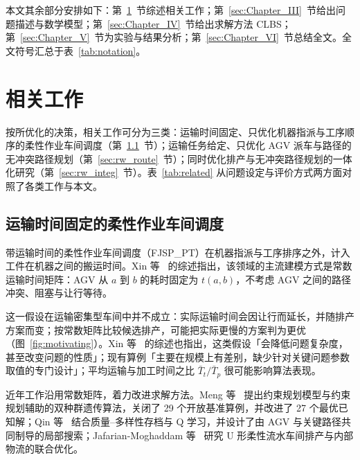 \documentclass[manuscript,screen,review]{acmart}
\begin{document}
本文其余部分安排如下：第~\ref{sec:Chapter_II}~节综述相关工作；第~\ref{sec:Chapter_III}~节给出问题描述与数学模型；第~\ref{sec:Chapter_IV}~节给出求解方法 CLBS；第~\ref{sec:Chapter_V}~节为实验与结果分析；第~\ref{sec:Chapter_VI}~节总结全文。全文符号汇总于表~\ref{tab:notation}。

\section{相关工作}
\label{sec:Chapter_II}

按所优化的决策，相关工作可分为三类：运输时间固定、只优化机器指派与工序顺序的柔性作业车间调度（第~\ref{sec:rw_fjsp}~节）；运输任务给定、只优化 AGV 派车与路径的无冲突路径规划（第~\ref{sec:rw_route}~节）；同时优化排产与无冲突路径规划的一体化研究（第~\ref{sec:rw_integ}~节）。表~\ref{tab:related} 从问题设定与评价方式两方面对照了各类工作与本文。

\subsection{运输时间固定的柔性作业车间调度}
\label{sec:rw_fjsp}

带运输时间的柔性作业车间调度（FJSP\_PT）在机器指派与工序排序之外，计入工件在机器之间的搬运时间。Xin 等~\cite{xin2025review} 的综述指出，该领域的主流建模方式是常数运输时间矩阵：AGV 从 $a$ 到 $b$ 的耗时固定为 $t(a,b)$，不考虑 AGV 之间的路径冲突、阻塞与让行等待。

这一假设在运输密集型车间中并不成立：实际运输时间会因让行而延长，并随排产方案而变；按常数矩阵比较候选排产，可能把实际更慢的方案判为更优（图~\ref{fig:motivating}）。Xin 等~\cite{xin2025review} 的综述也指出，这类假设「会降低问题复杂度，甚至改变问题的性质」；现有算例「主要在规模上有差别，缺少针对关键问题参数取值的专门设计」；平均运输与加工时间之比 $\bar{T}_t/\bar{T}_p$ 很可能影响算法表现。

近年工作沿用常数矩阵，着力改进求解方法。Meng 等~\cite{meng2025cp} 提出约束规划模型与约束规划辅助的双种群遗传算法，关闭了 29 个开放基准算例，并改进了 27 个最优已知解；Qin 等~\cite{qin2026knowledge} 结合质量--多样性存档与 Q 学习，并设计了由 AGV 与关键路径共同制导的局部搜索；Jafarian-Moghaddam 等~\cite{jafarian2026integrated} 研究 U 形柔性流水车间排产与内部物流的联合优化。
\end{document}
